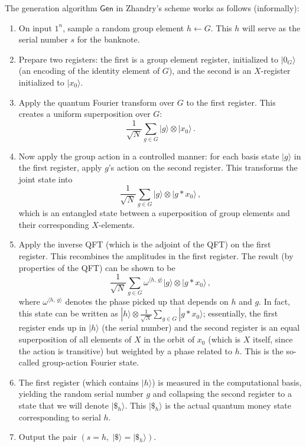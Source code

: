 \documentclass[12pt]{report}
\begin{document}
The generation algorithm $\mathsf{Gen}$ in Zhandry’s scheme works as follows (informally):
\begin{enumerate}
    \item On input $1^n$, sample a random group element $h \leftarrow G$. This $h$ will serve as the serial number $s$ for the banknote.
    \item Prepare two registers: the first is a group element register, initialized to $|0_G\rangle$ (an encoding of the identity element of $G$), and the second is an $X$-register initialized to $|x_0\rangle$.
    \item Apply the quantum Fourier transform over $G$ to the first register. This creates a uniform superposition over $G$: 
    \[
    \frac{1}{\sqrt{N}} \sum_{g \in G} |g\rangle \otimes |x_0\rangle\,.
    \] 
    \item Now apply the group action in a controlled manner: for each basis state $|g\rangle$ in the first register, apply $g$’s action on the second register. This transforms the joint state into 
    \[
    \frac{1}{\sqrt{N}} \sum_{g \in G} |g\rangle \otimes |g * x_0\rangle\,,
    \] 
    which is an entangled state between a superposition of group elements and their corresponding $X$-elements.
    \item Apply the inverse QFT (which is the adjoint of the QFT) on the first register. This recombines the amplitudes in the first register. The result (by properties of the QFT) can be shown to be 
    \[
    \frac{1}{\sqrt{N}} \sum_{g \in G} \omega^{\langle h,\,g \rangle} |g\rangle \otimes |g * x_0\rangle\,,
    \] 
    where $\omega^{\langle h,\,g \rangle}$ denotes the phase picked up that depends on $h$ and $g$. In fact, this state can be written as $|h\rangle \otimes \frac{1}{\sqrt{N}}\sum_{g \in G} |g * x_0\rangle$; essentially, the first register ends up in $|h\rangle$ (the serial number) and the second register is an equal superposition of all elements of $X$ in the orbit of $x_0$ (which is $X$ itself, since the action is transitive) but weighted by a phase related to $h$. This is the so-called group-action Fourier state.
    \item The first register (which contains $|h\rangle$) is measured in the computational basis, yielding the random serial number $g$ and collapsing the second register to a state that we will denote $|\$_h\rangle$. This $|\$_h\rangle$ is the actual quantum money state corresponding to serial $h$.
    \item Output the pair $(s = h,\; |\$\rangle = |\$_h\rangle)$.
\end{enumerate}
\end{document}
